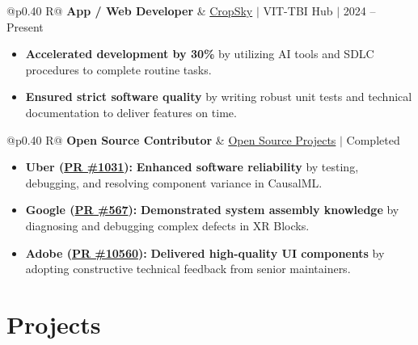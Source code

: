 \documentclass[a4paper,11pt]{article}
\newcommand{\subheading}[1]{\textbf{#1}}
\newcommand{\meta}[1]{{\fontsize{10}{12}\selectfont\textcolor[HTML]{3A3A3A}{#1}}}
\newcommand{\ulink}[2]{\href{#1}{#2}}
\begin{document}
\begin{tabularx}{\linewidth}{@{}p{0.40\linewidth} R@{}}
\subheading{App / Web Developer} & \meta{\ulink{https://sites.google.com/view/cropsky/home}{CropSky} $|$ VIT-TBI Hub $|$ 2024 -- Present}
\end{tabularx}
\begin{itemize}[nosep, leftmargin=1.5em, itemsep=2pt, topsep=2pt]
  \item {\color[HTML]{0A0A0A}\fontsize{11}{14}\selectfont \textbf{Accelerated development by 30\%} by utilizing AI tools and SDLC procedures to complete routine tasks.}
  \item {\color[HTML]{0A0A0A}\fontsize{11}{14}\selectfont \textbf{Ensured strict software quality} by writing robust unit tests and technical documentation to deliver features on time.}
\end{itemize}

\begin{tabularx}{\linewidth}{@{}p{0.40\linewidth} R@{}}
\subheading{Open Source Contributor} & \meta{\ulink{https://github.com/su-jin1425/My-Open-Source-Contributions}{Open Source Projects} $|$ Completed}
\end{tabularx}
\begin{itemize}[nosep, leftmargin=1.5em, itemsep=2pt, topsep=2pt]
  \item {\color[HTML]{0A0A0A}\fontsize{11}{14}\selectfont \textbf{Uber (\ulink{https://github.com/uber/causalml/pull/1031}{PR \#1031}):} \textbf{Enhanced software reliability} by testing, debugging, and resolving component variance in CausalML.}
  \item {\color[HTML]{0A0A0A}\fontsize{11}{14}\selectfont \textbf{Google (\ulink{https://github.com/google/xrblocks/pull/567}{PR \#567}):} \textbf{Demonstrated system assembly knowledge} by diagnosing and debugging complex defects in XR Blocks.}
  \item {\color[HTML]{0A0A0A}\fontsize{11}{14}\selectfont \textbf{Adobe (\ulink{https://github.com/adobe/react-spectrum/pull/10560}{PR \#10560}):} \textbf{Delivered high-quality UI components} by adopting constructive technical feedback from senior maintainers.}
\end{itemize}

\section{Projects}
\vspace{2pt}
\end{document}
